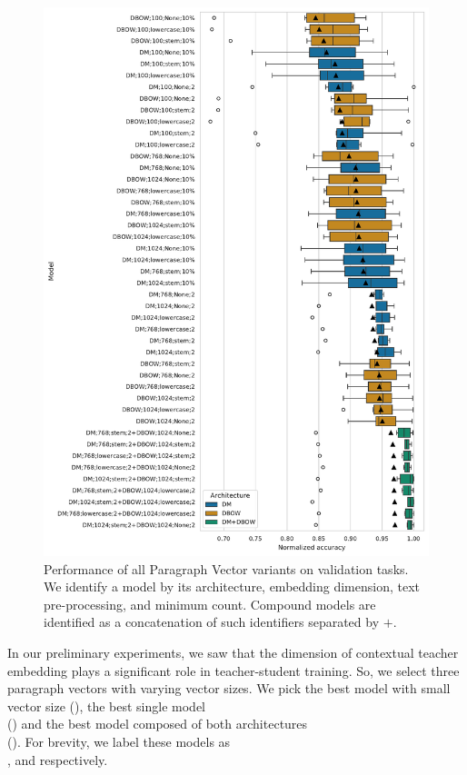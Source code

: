 \begin{figure}

    \includegraphics[width=\textwidth]{./img/pv_val_scores.pdf}

    \caption{Performance of all Paragraph Vector variants on validation tasks.
    We identify a model by its architecture, embedding dimension, text
    pre-processing, and minimum count. Compound models are identified as a
    concatenation of such identifiers separated by $+$.}

    \label{fig:pv_val_scores}

\end{figure}

In our preliminary experiments, we saw that the dimension of contextual teacher
embedding plays a significant role in teacher-student training. So, we select
three paragraph vectors with varying vector sizes. We pick the best model with
small vector size (), the best single model \\
() and the best model composed of both architectures \\
(). For brevity, we label these models as \\
,  and  respectively.

